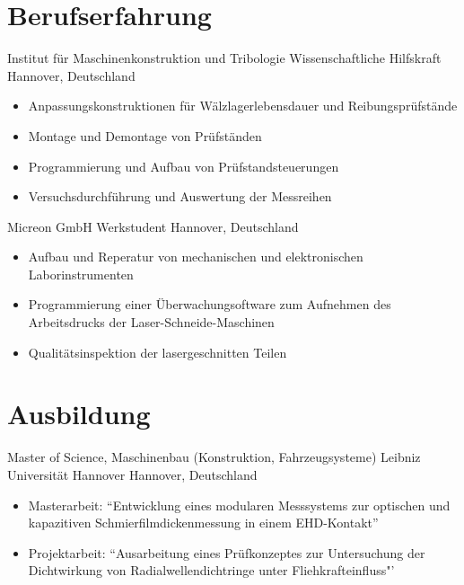 \documentclass[11pt,a4paper,sans]{moderncv}
\begin{document}
\section{\textbf{Berufserfahrung}}

{Institut für Maschinenkonstruktion und Tribologie}
{Wissenschaftliche Hilfskraft}
{Hannover, Deutschland}
{}
{
    \begin{itemize}
        \item Anpassungskonstruktionen für Wälzlagerlebensdauer und Reibungsprüfstände
        \item Montage und Demontage von Prüfständen
        \item Programmierung und Aufbau von Prüfstandsteuerungen
        \item Versuchsdurchführung und Auswertung der Messreihen
    \end{itemize}
}

{Micreon GmbH}
{Werkstudent}
{Hannover, Deutschland}
{}
{
    \begin{itemize}
        \item Aufbau und Reperatur von mechanischen und elektronischen Laborinstrumenten
        \item Programmierung einer Überwachungsoftware zum Aufnehmen des Arbeitsdrucks der Laser-Schneide-Maschinen
        \item Qualitätsinspektion der lasergeschnitten Teilen
    \end{itemize}
}



\section{\textbf{Ausbildung}}

{Master of Science, Maschinenbau (Konstruktion, Fahrzeugsysteme)}
{Leibniz Universität Hannover}
{Hannover, Deutschland}
{}
{
    \begin{itemize}
        \item Masterarbeit: ``Entwicklung eines modularen Messsystems zur optischen und kapazitiven Schmierfilmdicken\-messung in einem EHD-Kontakt''
        \item Projektarbeit: ``Ausarbeitung eines Prüfkonzeptes zur Untersuchung der Dichtwirkung von Radialwellendichtringe unter Fliehkrafteinfluss"'
    \end{itemize}
}
\end{document}
